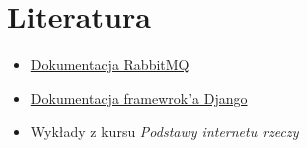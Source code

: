 \documentclass[12pt,a4paper]{article}
\begin{document}
    \section{Literatura}
    \begin{itemize}
        \item \href{https://www.rabbitmq.com/documentation.html}{Dokumentacja RabbitMQ}
        \item \href{https://docs.djangoproject.com/en/4.1/}{Dokumentacja framewrok'a Django}
        \item Wykłady z kursu \emph{Podstawy internetu rzeczy}
    \end{itemize}
\end{document}
